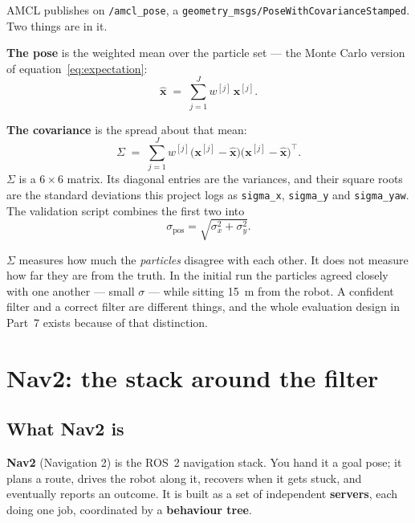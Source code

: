 \documentclass[11pt,a4paper]{report}
\newcommand{\term}[1]{\textcolor{rust}{\textbf{#1}}}
\newcommand{\file}[1]{\texttt{\small #1}}
\newcommand{\xt}{\mathbf{x}}
\begin{document}
AMCL publishes on \file{/amcl\_pose}, a
\file{geometry\_msgs/PoseWithCovarianceStamped}. Two things are in it.

\textbf{The pose} is the weighted mean over the particle set --- the Monte
Carlo version of equation~\eqref{eq:expectation}:
\begin{equation}
\hat{\xt} \;=\; \sum_{j=1}^{J} w^{[j]}\, \xt^{[j]} .
\label{eq:posemean}
\end{equation}

\textbf{The covariance} is the spread about that mean:
\begin{equation}
\Sigma \;=\; \sum_{j=1}^{J} w^{[j]}
\bigl(\xt^{[j]} - \hat{\xt}\bigr)\bigl(\xt^{[j]} - \hat{\xt}\bigr)^{\!\top} .
\label{eq:cov}
\end{equation}
$\Sigma$ is a $6 \times 6$ matrix. Its diagonal entries are the variances, and
their square roots are the standard deviations this project logs as
\file{sigma\_x}, \file{sigma\_y} and \file{sigma\_yaw}. The validation script
combines the first two into
\[
\sigma_{\text{pos}} = \sqrt{\sigma_x^2 + \sigma_y^2}.
\]

\begin{warnbox}
$\Sigma$ measures how much the \emph{particles} disagree with each other. It
does not measure how far they are from the truth. In the initial run the
particles agreed closely with one another --- small $\sigma$ --- while sitting
\SI{15}{\metre} from the robot. A confident filter and a correct filter are
different things, and the whole evaluation design in Part~7 exists because of
that distinction.
\end{warnbox}

\chapter{Nav2: the stack around the filter}
\label{ch:nav2}

\section{What Nav2 is}

\term{Nav2} (Navigation 2) is the ROS~2 navigation stack. You hand it a goal
pose; it plans a route, drives the robot along it, recovers when it gets
stuck, and eventually reports an outcome. It is built as a set of independent
\term{servers}, each doing one job, coordinated by a \term{behaviour tree}.
\end{document}
